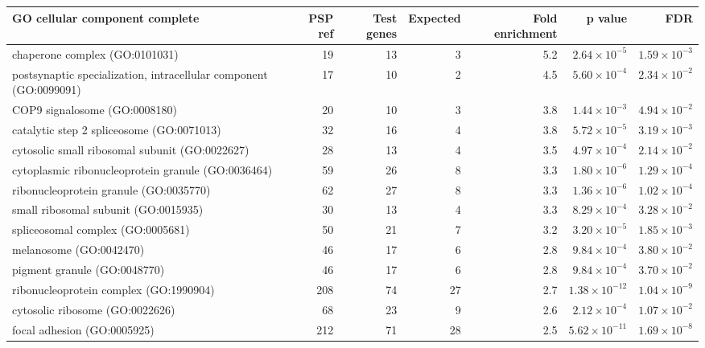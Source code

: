 \begin{table}[ht]
\centering
\begin{adjustbox}{width=\textwidth}

\begin{tabular}{lrrrrrr}
  \hline
GO cellular component complete & PSP ref & Test genes & Expected & Fold enrichment & p value & FDR \\ 
  \hline
chaperone complex (GO:0101031) & 19 & 13 & 3 & 5.2 & $2.64 \times 10^{-5}$ & $1.59 \times 10^{-3}$ \\ 
  postsynaptic specialization, intracellular component (GO:0099091) & 17 & 10 & 2 & 4.5 & $5.60 \times 10^{-4}$ & $2.34 \times 10^{-2}$ \\ 
  COP9 signalosome (GO:0008180) & 20 & 10 & 3 & 3.8 & $1.44 \times 10^{-3}$ & $4.94 \times 10^{-2}$ \\ 
  catalytic step 2 spliceosome (GO:0071013) & 32 & 16 & 4 & 3.8 & $5.72 \times 10^{-5}$ & $3.19 \times 10^{-3}$ \\ 
  cytosolic small ribosomal subunit (GO:0022627) & 28 & 13 & 4 & 3.5 & $4.97 \times 10^{-4}$ & $2.14 \times 10^{-2}$ \\ 
  cytoplasmic ribonucleoprotein granule (GO:0036464) & 59 & 26 & 8 & 3.3 & $1.80 \times 10^{-6}$ & $1.29 \times 10^{-4}$ \\ 
  ribonucleoprotein granule (GO:0035770) & 62 & 27 & 8 & 3.3 & $1.36 \times 10^{-6}$ & $1.02 \times 10^{-4}$ \\ 
  small ribosomal subunit (GO:0015935) & 30 & 13 & 4 & 3.3 & $8.29 \times 10^{-4}$ & $3.28 \times 10^{-2}$ \\ 
  spliceosomal complex (GO:0005681) & 50 & 21 & 7 & 3.2 & $3.20 \times 10^{-5}$ & $1.85 \times 10^{-3}$ \\ 
  melanosome (GO:0042470) & 46 & 17 & 6 & 2.8 & $9.84 \times 10^{-4}$ & $3.80 \times 10^{-2}$ \\ 
  pigment granule (GO:0048770) & 46 & 17 & 6 & 2.8 & $9.84 \times 10^{-4}$ & $3.70 \times 10^{-2}$ \\ 
  ribonucleoprotein complex (GO:1990904) & 208 & 74 & 27 & 2.7 & $1.38 \times 10^{-12}$ & $1.04 \times 10^{-9}$ \\ 
  cytosolic ribosome (GO:0022626) & 68 & 23 & 9 & 2.6 & $2.12 \times 10^{-4}$ & $1.07 \times 10^{-2}$ \\ 
  focal adhesion (GO:0005925) & 212 & 71 & 28 & 2.5 & $5.62 \times 10^{-11}$ & $1.69 \times 10^{-8}$ \\ 

\end{tabular}
\end{adjustbox}
\end{table}
